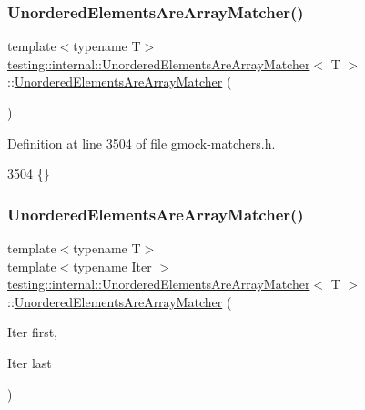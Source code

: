 \subsubsection{\texorpdfstring{Unordered\+Elements\+Are\+Array\+Matcher()}{UnorderedElementsAreArrayMatcher()}\hspace{0.1cm}{\footnotesize\ttfamily [1/2]}}
{\footnotesize\ttfamily template$<$typename T$>$ \\
\hyperlink{classtesting_1_1internal_1_1UnorderedElementsAreArrayMatcher}{testing\+::internal\+::\+Unordered\+Elements\+Are\+Array\+Matcher}$<$ T $>$\+::\hyperlink{classtesting_1_1internal_1_1UnorderedElementsAreArrayMatcher}{Unordered\+Elements\+Are\+Array\+Matcher} (\begin{DoxyParamCaption}{ }\end{DoxyParamCaption})\hspace{0.3cm}{\ttfamily [inline]}}



Definition at line 3504 of file gmock-\/matchers.\+h.


\begin{DoxyCode}
3504 \{\}
\end{DoxyCode}
\mbox{\label{classtesting_1_1internal_1_1UnorderedElementsAreArrayMatcher_a5a91694cf5088cb0b7f4b1bb57dee957}} 
\subsubsection{\texorpdfstring{Unordered\+Elements\+Are\+Array\+Matcher()}{UnorderedElementsAreArrayMatcher()}\hspace{0.1cm}{\footnotesize\ttfamily [2/2]}}
{\footnotesize\ttfamily template$<$typename T$>$ \\
template$<$typename Iter $>$ \\
\hyperlink{classtesting_1_1internal_1_1UnorderedElementsAreArrayMatcher}{testing\+::internal\+::\+Unordered\+Elements\+Are\+Array\+Matcher}$<$ T $>$\+::\hyperlink{classtesting_1_1internal_1_1UnorderedElementsAreArrayMatcher}{Unordered\+Elements\+Are\+Array\+Matcher} (\begin{DoxyParamCaption}\item[{Iter}]{first,  }\item[{Iter}]{last }\end{DoxyParamCaption})\hspace{0.3cm}{\ttfamily [inline]}}



